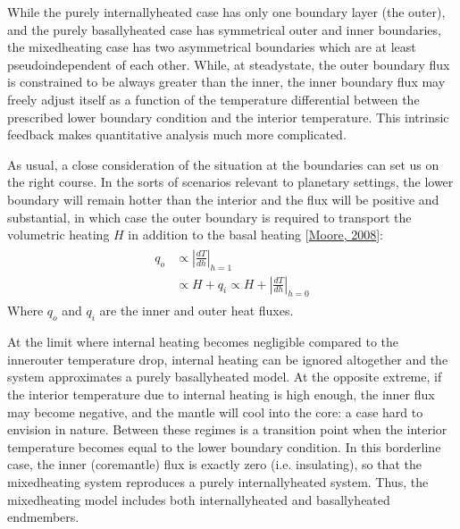 \documentclass[letterpaper,10pt,english]{jupyterBook}
\begin{document}
\sphinxAtStartPar
While the purely internally\sphinxhyphen{}heated case has only one boundary layer (the outer), and the purely basally\sphinxhyphen{}heated case has symmetrical outer and inner boundaries, the mixed\sphinxhyphen{}heating case has two asymmetrical boundaries which are at least pseudo\sphinxhyphen{}independent of each other. While, at steady\sphinxhyphen{}state, the outer boundary flux is constrained to be always greater than the inner, the inner boundary flux may freely adjust itself as a function of the temperature differential between the prescribed lower boundary condition and the interior temperature. This intrinsic feedback makes quantitative analysis much more complicated.

\sphinxAtStartPar
As usual, a close consideration of the situation at the boundaries can set us on the right course. In the sorts of scenarios relevant to planetary settings, the lower boundary will remain hotter than the interior and the flux will be positive and substantial, in which case the outer boundary is required to transport the volumetric heating \(H\) in addition to the basal heating {[}\hyperlink{cite.references:id667}{Moore, 2008}{]}:
\begin{equation*}
\begin{split} \begin{align*}
{q}_{o} &\propto {\left| \frac{dT}{dh} \right|}_{h=1} \\
&\propto H + {q}_{i} \propto H + {\left| \frac{dT}{dh} \right|}_{h=0}
\end{align*} \end{split}
\end{equation*}
\sphinxAtStartPar
Where \({q}_{o}\) and \({q}_{i}\) are the inner and outer heat fluxes.

\sphinxAtStartPar
At the limit where internal heating becomes negligible compared to the inner\sphinxhyphen{}outer temperature drop, internal heating can be ignored altogether and the system approximates a purely basally\sphinxhyphen{}heated model. At the opposite extreme, if the interior temperature due to internal heating is high enough, the inner flux may become negative, and the mantle will cool into the core: a case hard to envision in nature. Between these regimes is a transition point when the interior temperature becomes equal to the lower boundary condition. In this borderline case, the inner (core\sphinxhyphen{}mantle) flux is exactly zero (i.e. insulating), so that the mixed\sphinxhyphen{}heating system reproduces a purely internally\sphinxhyphen{}heated system. Thus, the mixed\sphinxhyphen{}heating model includes both internally\sphinxhyphen{}heated and basally\sphinxhyphen{}heated endmembers.
\end{document}
